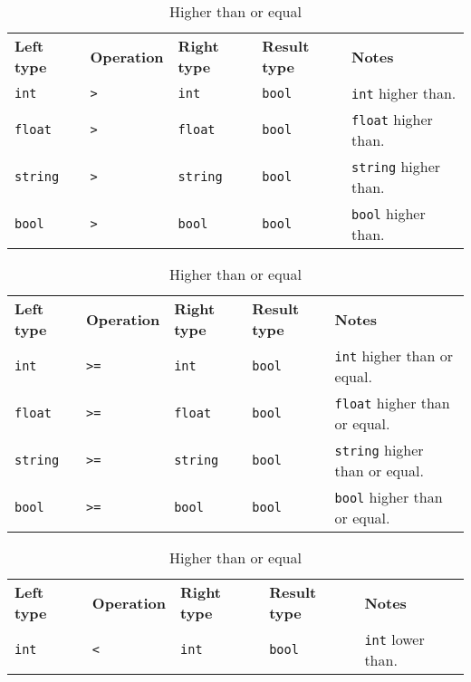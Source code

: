 \begin{table}[H]
	\centering
	\begin{subtable}{\textwidth}
		\centering
        \begin{tabular}{ l l l l p{9.5cm} }
            \textbf{Left type} & \textbf{Operation} & \textbf{Right type} & \textbf{Result type} & \textbf{Notes} \\
            \texttt{int} & \texttt{>} & \texttt{int} & \texttt{bool} & \texttt{int} higher than.\\
            \texttt{float} & \texttt{>} & \texttt{float} & \texttt{bool} & \texttt{float} higher than.\\
            \texttt{string} & \texttt{>} & \texttt{string} & \texttt{bool} & \texttt{string} higher than.\\
            \texttt{bool} & \texttt{>} & \texttt{bool} & \texttt{bool} & \texttt{bool} higher than.\\
		\end{tabular}
		\caption{Higher than}
	\end{subtable}
	\begin{subtable}{\textwidth}
		\centering
        \begin{tabular}{ l l l l p{9.5cm} }
            \textbf{Left type} & \textbf{Operation} & \textbf{Right type} & \textbf{Result type} & \textbf{Notes} \\
            \texttt{int} & \texttt{>=} & \texttt{int} & \texttt{bool} & \texttt{int} higher than or equal.\\
            \texttt{float} & \texttt{>=} & \texttt{float} & \texttt{bool} & \texttt{float} higher than or equal.\\
            \texttt{string} & \texttt{>=} & \texttt{string} & \texttt{bool} & \texttt{string} higher than or equal.\\
            \texttt{bool} & \texttt{>=} & \texttt{bool} & \texttt{bool} & \texttt{bool} higher than or equal.\\
		\end{tabular}
		\caption{Higher than or equal}
	\end{subtable}
    \begin{subtable}{\textwidth}
		\centering
        \begin{tabular}{ l l l l p{9.5cm} }
            \textbf{Left type} & \textbf{Operation} & \textbf{Right type} & \textbf{Result type} & \textbf{Notes} \\
            \texttt{int} & \texttt{<} & \texttt{int} & \texttt{bool} & \texttt{int} lower than.\\

\end{tabular}
\end{subtable}
\end{table}
